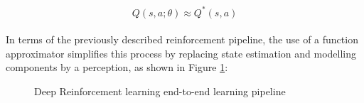 \begin{equation}
Q(s, a; \theta) \approx Q^*(s,a)
\end{equation}
\\
In terms of the previously described reinforcement pipeline, the use of a function approximator simplifies this process by replacing state estimation and modelling components by a perception, as shown in Figure \ref{fig:drl-pipeline}:
\begin{figure}[H]
    \centering
    \caption{Deep Reinforcement learning end-to-end learning pipeline}
    \label{fig:drl-pipeline}
\end{figure}
